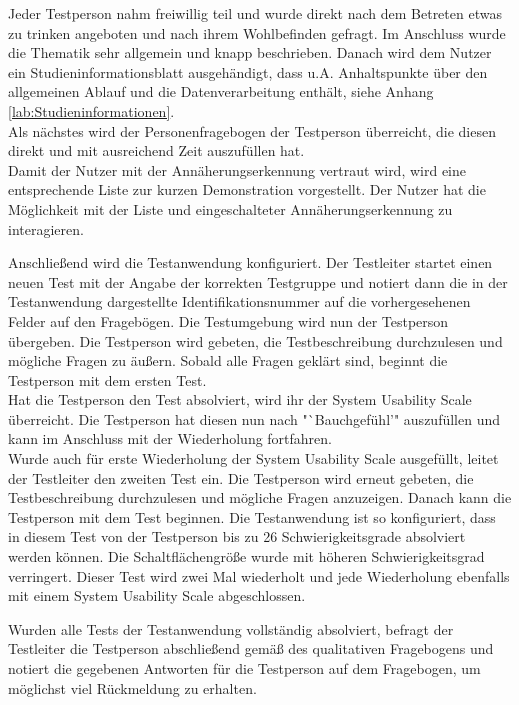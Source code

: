 \documentclass[a4paper,12pt,bibliography=totoc]{scrreprt}%
\begin{document}
Jeder Testperson nahm freiwillig teil und wurde direkt nach dem Betreten etwas zu trinken angeboten und nach ihrem Wohlbefinden gefragt. Im Anschluss wurde die Thematik sehr allgemein und knapp beschrieben. Danach wird dem Nutzer ein Studieninformationsblatt ausgehändigt, dass u.A. Anhaltspunkte über den allgemeinen Ablauf und die Datenverarbeitung enthält, siehe Anhang \ref{lab:Studieninformationen}.\\
Als nächstes wird der Personenfragebogen der Testperson überreicht, die diesen direkt und mit ausreichend Zeit auszufüllen hat.\\
Damit der Nutzer mit der Annäherungserkennung vertraut wird, wird eine entsprechende Liste zur kurzen Demonstration vorgestellt. Der Nutzer hat die Möglichkeit mit der Liste und eingeschalteter Annäherungserkennung zu interagieren.

Anschließend wird die Testanwendung konfiguriert. Der Testleiter startet einen neuen Test mit der Angabe der korrekten Testgruppe und notiert dann die in der Testanwendung dargestellte Identifikationsnummer auf die vorhergesehenen Felder auf den Fragebögen. Die Testumgebung wird nun der Testperson übergeben. Die Testperson wird gebeten, die Testbeschreibung durchzulesen und mögliche Fragen zu äußern. Sobald alle Fragen geklärt sind, beginnt die Testperson mit dem ersten Test.\\
Hat die Testperson den Test absolviert, wird ihr der System Usability Scale überreicht. Die Testperson hat diesen nun nach "`Bauchgefühl'" auszufüllen und kann im Anschluss mit der Wiederholung fortfahren.\\
Wurde auch für erste Wiederholung der System Usability Scale ausgefüllt, leitet der Testleiter den zweiten Test ein. Die Testperson wird erneut gebeten, die Testbeschreibung durchzulesen und mögliche Fragen anzuzeigen. Danach kann die Testperson mit dem Test beginnen. Die Testanwendung ist so konfiguriert, dass in diesem Test von der Testperson bis zu 26 Schwierigkeitsgrade absolviert werden können. Die Schaltflächengröße wurde mit höheren Schwierigkeitsgrad verringert. Dieser Test wird zwei Mal wiederholt und jede Wiederholung ebenfalls mit einem System Usability Scale abgeschlossen.

Wurden alle Tests der Testanwendung vollständig absolviert, befragt der Testleiter die Testperson abschließend gemäß des qualitativen Fragebogens und notiert die gegebenen Antworten für die Testperson auf dem Fragebogen, um möglichst viel Rückmeldung zu erhalten. 
\end{document}
